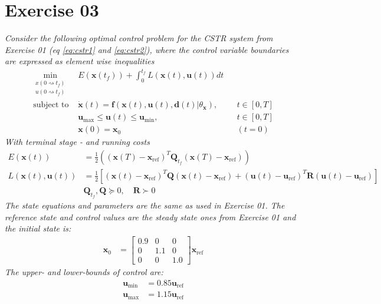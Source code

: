 \documentclass[letterpaper,12pt]{article}
\begin{document}
\section*{Exercise 03}
\textit{Consider the following optimal control problem for the CSTR system from Exercise 01 (eq \ref{eq:cstr1} and \ref{eq:cstr2}), where the control variable boundaries are expressed as element wise inequalities}
\begin{equation}
\begin{alignedat}{2}
	\min_{\substack{x(0\rightsquigarrow t_f) \\ u(0\rightsquigarrow t_f) }} & E(\mathbf{x}(t_f)) + 
		\int_0^{t_f} L(\mathbf{x}(t),\mathbf{u}(t))dt \\
	\text{subject to } & \dot{\mathbf{x}}(t) = \mathbf{f}(\mathbf{x}(t),\mathbf{u}(t),\mathbf{d}(t) | \theta_{\mathbf{x}}),  && t \in [0, T] \\
	& \mathbf{u}_{\text{max}} \leq \mathbf{u}(t) \leq \mathbf{u}_{\text{min}},  &&t \in [0,T] \\
	& \mathbf{x}(0) = \mathbf{x}_0  &&(t = 0)
\end{alignedat}
\end{equation}
\textit{With terminal stage - and running costs}
\begin{equation}
\begin{aligned}
	E(\mathbf{x}(t)) &= \frac{1}{2}\left( (\mathbf{x}(T) - \mathbf{x}_{\text{ref}}) ^T \mathbf{Q}_{t_f} (\mathbf{x}(T) - \mathbf{x}_{\text{ref}}) \right) \\
	L(\mathbf{x}(t),\mathbf{u}(t)) &= \frac{1}{2}\left[ (\mathbf{x}(t) - \mathbf{x}_{\text{ref}}) ^T \mathbf{Q} (\mathbf{x}(t) - \mathbf{x}_{\text{ref}}) + (\mathbf{u}(t) - \mathbf{u}_{\text{ref}}) ^T \mathbf{R} (\mathbf{u}(t) - \mathbf{u}_{\text{ref}}) \right] \\
	& \mathbf{Q}_{t_f}, \mathbf{Q} \succeq 0, \quad \mathbf{R} \succ 0
\end{aligned}
\end{equation}
\textit{The state equations and parameters are the same as used in Exercise 01. The reference state and control values are the steady state ones from Exercise 01 and the initial state is:}
\begin{equation}
\begin{aligned}
	\mathbf{x}_0 &= \begin{bmatrix}
		0.9 & 0 & 0 \\ 0 & 1.1 & 0 \\ 0 & 0 & 1.0
	\end{bmatrix} \mathbf{x}_{\text{ref}}
\end{aligned}
\end{equation}
\textit{The upper- and lower-bounds of control are:}
\begin{equation}
\begin{aligned}
	\mathbf{u}_{\text{min}} &= 0.85 \mathbf{u}_{\text{ref}} \\
	\mathbf{u}_{\text{max}} &= 1.15 \mathbf{u}_{\text{ref}} 
\end{aligned}
\end{equation}
\end{document}
